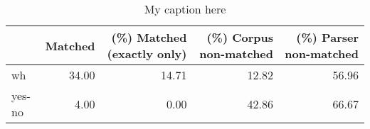 \begin{table}[!ht]
\centering
\begin{tabular}{lrrrr}
\toprule
{} &  Matched &  (\%) Matched (exactly only) &  (\%) Corpus non-matched &  (\%) Parser non-matched \\
\midrule
wh     &    34.00 &                       14.71 &                   12.82 &                   56.96 \\
yes-no &     4.00 &                        0.00 &                   42.86 &                   66.67 \\
\bottomrule
\end{tabular}
\caption{My caption here}
\label{tab:INTERROGATIVE-ocd-relative}
\end{table}